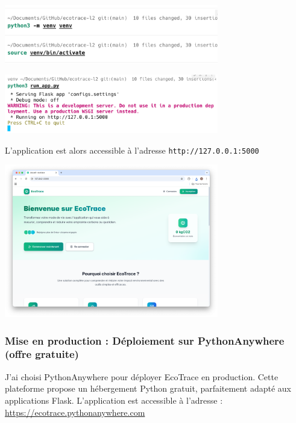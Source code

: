 \documentclass[a4paper,11pt]{article}
\begin{document}
\begin{enumerate}
                            \begin{center}
                                \includegraphics[width=0.7\textwidth]{captures/servir/dev/img1.png}
                            \end{center}
                            \begin{center}
                                \includegraphics[width=0.7\textwidth]{captures/servir/dev/img2.png}
                            \end{center}

                            \noindent L'application est alors accessible à l'adresse \texttt{http://127.0.0.1:5000}

                            \begin{center}
                                \includegraphics[width=0.7\textwidth]{captures/servir/dev/img4.png}
                            \end{center}
                    \end{enumerate}

            \subsubsection{Mise en production : Déploiement sur PythonAnywhere (offre gratuite)}
                \noindent J'ai choisi PythonAnywhere pour déployer EcoTrace en production. Cette plateforme propose un hébergement Python gratuit, parfaitement adapté aux applications Flask. L'application est accessible à l'adresse : \url{https://ecotrace.pythonanywhere.com}
\end{document}
